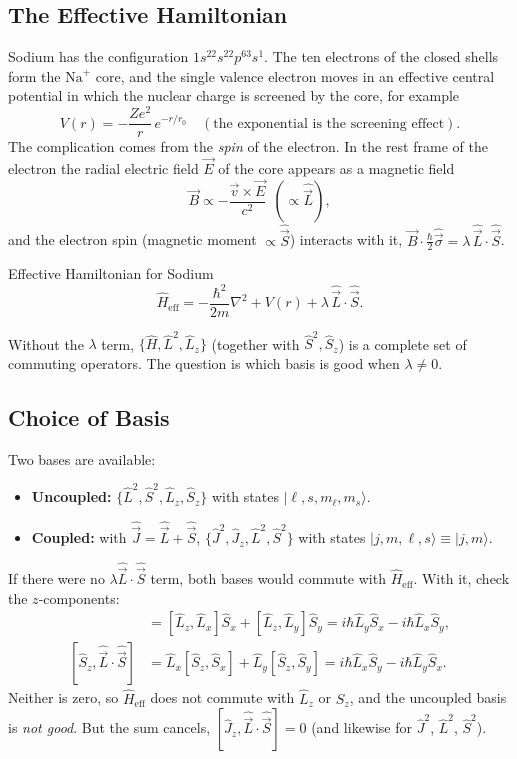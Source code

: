 \documentclass[11pt,a4paper]{article}
\begin{document}
\subsection{The Effective Hamiltonian}
Sodium has the configuration $1s^22s^22p^63s^1$. The ten electrons of the closed shells form the $\mathrm{Na}^+$ core, and the single valence electron moves in an effective central potential in which the nuclear charge is screened by the core, for example
\[
V(r)=-\frac{Ze^2}r\,e^{-r/r_0}\quad(\text{the exponential is the screening effect}).
\]
The complication comes from the \emph{spin} of the electron. In the rest frame of the electron the radial electric field $\vec E$ of the core appears as a magnetic field
\[
\vec B\propto-\frac{\vec v\times\vec E}{c^2}\ \ (\propto\hat{\vec L}),
\]
and the electron spin (magnetic moment $\propto\hat{\vec S}$) interacts with it, $\vec B\cdot\tfrac\hbar2\hat{\vec\sigma}=\lambda\,\hat{\vec L}\cdot\hat{\vec S}$.

\begin{thm}{Effective Hamiltonian for Sodium}
\[
\hat H_{\mathrm{eff}}=-\frac{\hbar^2}{2m}\nabla^2+V(r)+\lambda\,\hat{\vec L}\cdot\hat{\vec S}.
\]
\end{thm}

Without the $\lambda$ term, $\{\hat H,\hat L^2,\hat L_z\}$ (together with $\hat S^2,\hat S_z$) is a complete set of commuting operators. The question is which basis is good when $\lambda\neq0$.

\subsection{Choice of Basis}
Two bases are available:
\begin{itemize}
\item \textbf{Uncoupled:} $\{\hat L^2,\hat S^2,\hat L_z,\hat S_z\}$ with states $|\ell,s,m_\ell,m_s\rangle$.
\item \textbf{Coupled:} with $\hat{\vec J}=\hat{\vec L}+\hat{\vec S}$, $\{\hat J^2,\hat J_z,\hat L^2,\hat S^2\}$ with states $|j,m,\ell,s\rangle\equiv|j,m\rangle$.
\end{itemize}
If there were no $\lambda\hat{\vec L}\cdot\hat{\vec S}$ term, both bases would commute with $\hat H_{\mathrm{eff}}$. With it, check the $z$-components:
\begin{align*}
[\hat L_z,\hat{\vec L}\cdot\hat{\vec S}]&=[\hat L_z,\hat L_x]\hat S_x+[\hat L_z,\hat L_y]\hat S_y=i\hbar\hat L_y\hat S_x-i\hbar\hat L_x\hat S_y,\\
[\hat S_z,\hat{\vec L}\cdot\hat{\vec S}]&=\hat L_x[\hat S_z,\hat S_x]+\hat L_y[\hat S_z,\hat S_y]=i\hbar\hat L_x\hat S_y-i\hbar\hat L_y\hat S_x .
\end{align*}
Neither is zero, so $\hat H_{\mathrm{eff}}$ does not commute with $\hat L_z$ or $\hat S_z$, and the uncoupled basis is \emph{not good}. But the sum cancels, $[\hat J_z,\hat{\vec L}\cdot\hat{\vec S}]=0$ (and likewise for $\hat J^2$, $\hat L^2$, $\hat S^2$).
\end{document}
